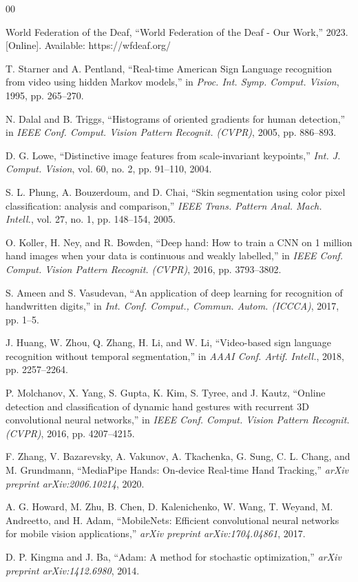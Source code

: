 \documentclass[conference]{IEEEtran}
\begin{document}
\begin{thebibliography}{00}

 World Federation of the Deaf, ``World Federation of the Deaf - Our Work,'' 2023. [Online]. Available: https://wfdeaf.org/

 T. Starner and A. Pentland, ``Real-time American Sign Language recognition from video using hidden Markov models,'' in \textit{Proc. Int. Symp. Comput. Vision}, 1995, pp. 265--270.

 N. Dalal and B. Triggs, ``Histograms of oriented gradients for human detection,'' in \textit{IEEE Conf. Comput. Vision Pattern Recognit. (CVPR)}, 2005, pp. 886--893.

 D. G. Lowe, ``Distinctive image features from scale-invariant keypoints,'' \textit{Int. J. Comput. Vision}, vol. 60, no. 2, pp. 91--110, 2004.

 S. L. Phung, A. Bouzerdoum, and D. Chai, ``Skin segmentation using color pixel classification: analysis and comparison,'' \textit{IEEE Trans. Pattern Anal. Mach. Intell.}, vol. 27, no. 1, pp. 148--154, 2005.

 O. Koller, H. Ney, and R. Bowden, ``Deep hand: How to train a CNN on 1 million hand images when your data is continuous and weakly labelled,'' in \textit{IEEE Conf. Comput. Vision Pattern Recognit. (CVPR)}, 2016, pp. 3793--3802.

 S. Ameen and S. Vasudevan, ``An application of deep learning for recognition of handwritten digits,'' in \textit{Int. Conf. Comput., Commun. Autom. (ICCCA)}, 2017, pp. 1--5.

 J. Huang, W. Zhou, Q. Zhang, H. Li, and W. Li, ``Video-based sign language recognition without temporal segmentation,'' in \textit{AAAI Conf. Artif. Intell.}, 2018, pp. 2257--2264.

 P. Molchanov, X. Yang, S. Gupta, K. Kim, S. Tyree, and J. Kautz, ``Online detection and classification of dynamic hand gestures with recurrent 3D convolutional neural networks,'' in \textit{IEEE Conf. Comput. Vision Pattern Recognit. (CVPR)}, 2016, pp. 4207--4215.

 F. Zhang, V. Bazarevsky, A. Vakunov, A. Tkachenka, G. Sung, C. L. Chang, and M. Grundmann, ``MediaPipe Hands: On-device Real-time Hand Tracking,'' \textit{arXiv preprint arXiv:2006.10214}, 2020.

 A. G. Howard, M. Zhu, B. Chen, D. Kalenichenko, W. Wang, T. Weyand, M. Andreetto, and H. Adam, ``MobileNets: Efficient convolutional neural networks for mobile vision applications,'' \textit{arXiv preprint arXiv:1704.04861}, 2017.

 D. P. Kingma and J. Ba, ``Adam: A method for stochastic optimization,'' \textit{arXiv preprint arXiv:1412.6980}, 2014.

\end{thebibliography}
\end{document}
